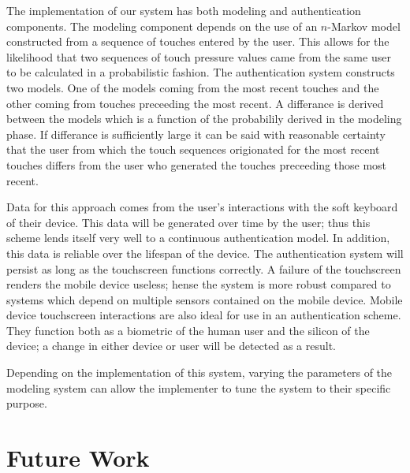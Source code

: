 \documentclass{acm_proc_article-sp}
\begin{document}
The implementation of our system has both modeling and authentication components. The modeling component depends on the use of an $n$-Markov model constructed from a sequence of touches entered by the user. This allows for the likelihood that two sequences of touch pressure values came from the same user to be calculated in a probabilistic fashion.
The authentication system constructs two models. One of the models coming from the most recent touches and the other coming from touches preceeding the most recent. A differance is derived between the models which is a function of the probabilily derived in the modeling phase. If differance is sufficiently large it can be said with reasonable certainty that the user from which the touch sequences origionated for the most recent touches differs from the user who generated the touches preceeding those most recent. 

Data for this approach comes from the user's interactions with the soft keyboard of their device. This data will be generated over time by the user; thus this scheme lends itself very well to a continuous authentication model. In addition, this data is reliable over the lifespan of the device. The authentication system will persist as long as the touchscreen functions correctly. A failure of the touchscreen renders the mobile device useless; hense the system is more robust compared to systems which depend on multiple sensors contained on the mobile device.
Mobile device touchscreen interactions are also ideal for use in an authentication scheme. They function both as a biometric of the human user and the silicon of the device; a change in either device or user will be detected as a result.

Depending on the implementation of this system, varying the parameters of the modeling system can allow the implementer to tune the system to their specific purpose. 

\section{Future Work}
\label{sec:futurework}



\end{document}
